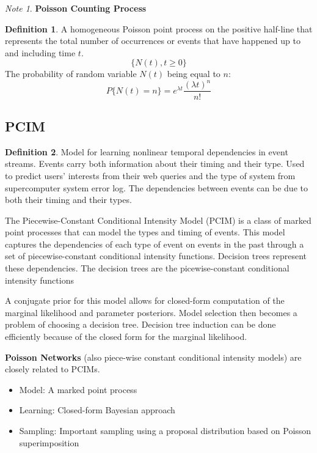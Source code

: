 \documentclass[12pt]{article}
\theoremstyle{plain}
\theoremstyle{definition}
\newtheorem{definition}{Definition}
\theoremstyle{remark}
\newtheorem*{note}{Note}
\begin{document}
\begin{note}

  \textbf{Poisson Counting Process}

\begin{definition}
  A homogeneous Poisson point process on the positive half-line that represents
  the total number of occurrences or events that have happened up to and
  including time $t$.
  \begin{equation*}
    \{ N(t), t \geq 0 \}
  \end{equation*}
  The probability of random variable $N(t)$ being equal to $n$:
  \begin{equation*}
    P\{N(t)=n\} = e^{\lambda t} \frac{(\lambda t)^n}{n!}
  \end{equation*}
\end{definition}

\end{note}

\subsection{PCIM}

\begin{definition}
  Model for learning nonlinear temporal dependencies in event streams.
  Events carry both information about their timing and their type.
  Used to predict users' interests from their web queries and the type of system
  from supercomputer system error log.
  The dependencies between events can be due to both their timing and their
  types.

  The Piecewise-Constant Conditional Intensity Model (PCIM) is a class of marked
  point processes that can model the types and timing of events.
  This model captures the dependencies of each type of event on events in the
  past through a set of piecewise-constant conditional intensity functions.
  Decision trees represent these dependencies. The decision trees are the
  picewise-constant conditional intensity functions \citep{gunmeexu11}

  A conjugate prior for this model allows for closed-form computation of the
  marginal likelihood and parameter posteriors.
  Model selection then becomes a problem of choosing a decision tree.
  Decision tree induction can be done efficiently because of the closed form for
  the marginal likelihood.

  \textbf{Poisson Networks} \citep{rajgraher05} (also piece-wise constant
  conditional intensity models) are closely related to PCIMs.

\begin{itemize}
  \item Model: A marked point process
  \item Learning: Closed-form Bayesian approach
  \item Sampling: Important sampling using a proposal distribution based on
    Poisson superimposition
\end{itemize}

\end{definition}



\end{document}
